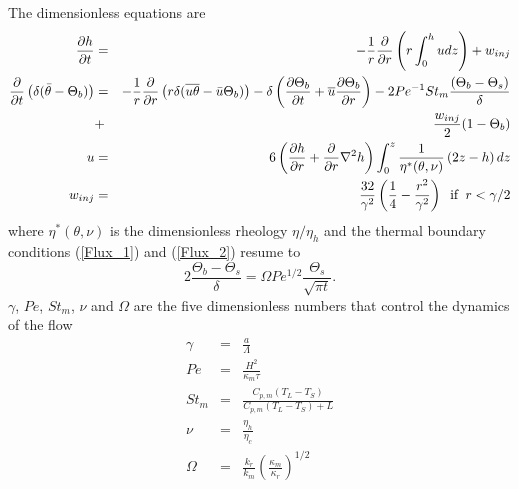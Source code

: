   The dimensionless equations are
  \begin{eqnarray}
    \frac{\partial         h}{\partial        t} &=&- \frac{1}{r}
                                                     \frac{\partial}{\partial r} \left( r\int_0^hudz\right) +w_{inj}\label{EqFinal1}\\
    \frac{\partial}{\partial
    t}\left( \delta( \bar{\theta}-\Theta_b)\right)&=&-\frac{1}{r}\frac{\partial}{\partial
                                                      r}  \left(   r\delta(\overline{u\theta}-\bar{u}\Theta_b)\right)  -
                                                      \delta\left(      \frac{\partial       \Theta_b}{\partial      t}+
                                                      \overline{u}\frac{\partial     \Theta_b}{\partial    r}\right)-
                                                      2Pe^{-1}St_m\frac{\left(\Theta_b-\Theta_s\right)}{\delta}\nonumber\\
                                                 &+&\frac{w_{inj}}{2}(1-\Theta_b)\label{HeatDimensionLess}\\
    u&=&6\left( \frac{\partial h}{\partial      r}+\frac{\partial}{\partial      r}\nabla^2h\right)\int_0^z
         \frac{1}{\eta^*(\theta,\nu)}\left( 2 z -h\right)dz \label{V3}\\
    w_{inj}&=&
               \frac{32}{\gamma^{2}}\left(\frac{1}{4}-\frac{r^{2}}{\gamma^{2}}\right)\hspace{.2cm}
               \text{if} \hspace{.2cm} r < \gamma/2
  \end{eqnarray}
  where $\eta^*(\theta,\nu)$ is the dimensionless rheology   $\eta/\eta_h$
  and the thermal boundary conditions (\ref{Flux_1}) and (\ref{Flux_2}) resume to
  \begin{equation}
    2\frac{\Theta_b-\Theta_s}{\delta}               =               \Omega
    Pe^{1/2}\frac{\Theta_s}{\sqrt{\pi t}}.
    \label{Boundary-Condi}
  \end{equation}
  $\gamma$, $Pe$, $St_m$, $\nu$ and $\Omega$ are the five
  dimensionless numbers that control the dynamics of the flow
  \begin{eqnarray}
    \gamma&=&\frac{a}{\Lambda} \label{gamma}\\
    Pe&=& \frac{H^2}{\kappa_m \tau}\label{Pe}\\
    St_m &=& \frac{C_{p,m}\left(T_L-T_S\right)}{C_{p,m}\left(T_L-T_S\right)+L} \label{St}\\
    \nu&=& \frac{\eta_h}{\eta_c}\label{nu}\\
   \Omega&=&\frac{k_r}{k_m}\left(\frac{\kappa_m}{\kappa_r}\right)^{1/2}\label{omega}
  \end{eqnarray}
